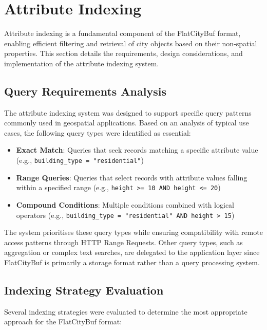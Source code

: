 \section{Attribute Indexing}
\label{methodology:attribute_index}

Attribute indexing is a fundamental component of the FlatCityBuf format, enabling efficient filtering and retrieval of city objects based on their non-spatial properties. This section details the requirements, design considerations, and implementation of the attribute indexing system.

\subsection{Query Requirements Analysis}
\label{methodology:attribute_index:query_requirements}

The attribute indexing system was designed to support specific query patterns commonly used in geospatial applications. Based on an analysis of typical use cases, the following query types were identified as essential:

\begin{itemize}
    \item \textbf{Exact Match}: Queries that seek records matching a specific attribute value (e.g., \texttt{building\_type = "residential"})
    \item \textbf{Range Queries}: Queries that select records with attribute values falling within a specified range (e.g., \texttt{height >= 10 AND height <= 20})
    \item \textbf{Compound Conditions}: Multiple conditions combined with logical operators (e.g., \texttt{building\_type = "residential" AND height > 15})
\end{itemize}

The system prioritises these query types while ensuring compatibility with remote access patterns through HTTP Range Requests. Other query types, such as aggregation or complex text searches, are delegated to the application layer since FlatCityBuf is primarily a storage format rather than a query processing system.

\subsection{Indexing Strategy Evaluation}
\label{methodology:attribute_index:indexing_strategy_evaluation}

Several indexing strategies were evaluated to determine the most appropriate approach for the FlatCityBuf format:


